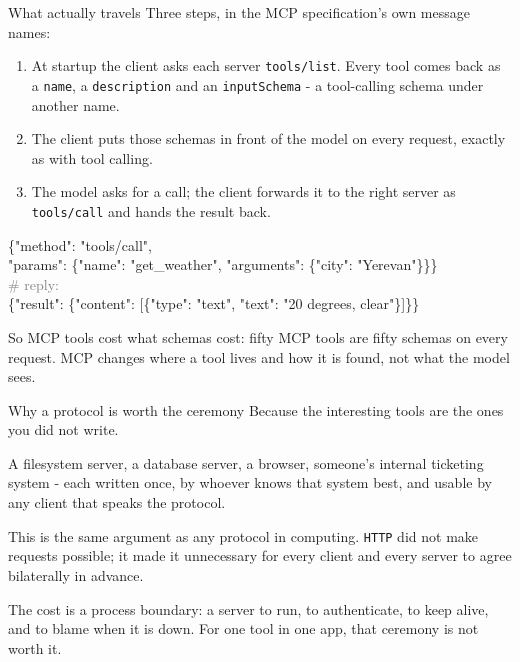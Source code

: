 \documentclass[aspectratio=169]{beamer}
\newcommand{\keybox}[1]{%
  \begin{tcolorbox}[colback=armblue!8, colframe=armblue, boxrule=0.6pt, arc=2pt]
  #1
  \end{tcolorbox}}
\newcommand{\takebox}[1]{%
  \begin{tcolorbox}[colback=paramgreen!8, colframe=paramgreen, boxrule=0.6pt, arc=2pt]
  #1
  \end{tcolorbox}}
\newcommand{\watchbox}[1]{%
  \begin{tcolorbox}[colback=armorange!12, colframe=armorange, boxrule=0.6pt, arc=2pt]
  #1
  \end{tcolorbox}}
\newcommand{\codebox}[1]{%
  \begin{center}
  \begin{tcolorbox}[colback=lightbg, colframe=gray, boxrule=0.5pt, arc=2pt,
                    width=0.94\textwidth, left=4pt, right=4pt, top=3pt, bottom=3pt]
    \ttfamily\scriptsize #1
  \end{tcolorbox}
  \end{center}}
\begin{document}
\begin{frame}{What actually travels}
  \vspace{0.2em}
  {\small Three steps, in the MCP specification's own message names:}

  \vspace{0.2em}
  \begin{enumerate}
    \item[\textbf{1.}] {\small At startup the client asks each server \texttt{tools/list}. Every
      tool comes back as a \texttt{name}, a \texttt{description} and an \texttt{inputSchema} -
      a tool-calling schema under another name.}
    \item[\textbf{2.}] {\small The client puts those schemas in front of the model on every
      request, exactly as with tool calling.}
    \item[\textbf{3.}] {\small The model asks for a call; the client forwards it to the right
      server as \texttt{tools/call} and hands the result back.}
  \end{enumerate}

  \codebox{\{"method": "tools/call",\\
  \hspace*{1em}"params": \{"name": "get\_weather", "arguments": \{"city": "Yerevan"\}\}\}\\
  \textcolor{gray}{\# reply:}\\
  \{"result": \{"content": [\{"type": "text", "text": "20 degrees, clear"\}]\}\}}

  \keybox{\small So MCP tools cost what schemas cost: fifty MCP tools are fifty schemas on every
  request. MCP changes where a tool lives and how it is found, not what the model sees.}
\end{frame}

\begin{frame}{Why a protocol is worth the ceremony}
  \vspace{0.35em}
  Because the interesting tools are the ones you did not write.

  \vspace{0.4em}
  A filesystem server, a database server, a browser, someone's internal ticketing system - each
  written once, by whoever knows that system best, and usable by any client that speaks the
  protocol.

  \vspace{0.45em}
  \takebox{This is the same argument as any protocol in computing. \texttt{HTTP} did not make
  requests possible; it made it unnecessary for every client and every server to agree
  bilaterally in advance.}

  \vspace{0.3em}
  \watchbox{The cost is a process boundary: a server to run, to authenticate, to keep alive, and
  to blame when it is down. For one tool in one app, that ceremony is not worth it.}
\end{frame}
\end{document}
